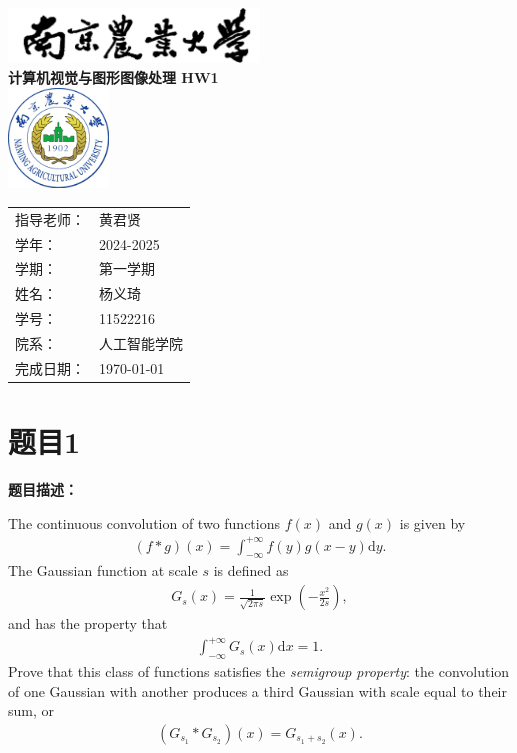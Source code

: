 \documentclass[UTF8]{ctexart}
\begin{document}
	\begin{titlepage}
		\centering
		\vspace*{2cm}
		\includegraphics[width=0.5\textwidth]{./image/name.png}\\[1cm] %
		{\Huge \textbf{计算机视觉与图形图像处理 HW1}}\\[2cm]
		\includegraphics[width=0.2\textwidth]{./image/NJAU.eps}\\[2cm] %
	    \begin{tabular}{ll} %
			{\Large 指导老师：} & {\Large 黄君贤} \\[0.5cm]
			{\Large 学年：} & {\Large 2024-2025} \\[0.5cm]
			{\Large 学期：} & {\Large 第一学期} \\[0.5cm]
			{\Large 姓名：} & {\Large 杨义琦} \\[0.5cm]
			{\Large 学号：} & {\Large 11522216} \\[0.5cm]
			{\Large 院系：} & {\Large 人工智能学院} \\[0.5cm]
			{\Large 完成日期：} & {\Large \today} \\ 
		\end{tabular}
		\vfill
	\end{titlepage}
	
	
	\section{题目1}
	\textbf{题目描述：}
	
	The continuous convolution of two functions $f(x)$ and $g(x)$ is given by
	\begin{align}
		\left(f*g\right)\left(x\right)=\int_{-\infty}^{+\infty}f\left(y\right)g\left(x-y\right) \mathrm{d}y.
	\end{align}
	The Gaussian function at scale $s$ is defined as
	\begin{align}
		G_s\left(x\right)=\frac{1}{\sqrt{2\pi s}}\exp\left(-\frac{x^2}{2s}\right),
	\end{align}
	and has the property that
	\begin{align}
		\int_{-\infty}^{+\infty}G_s\left(x\right) \mathrm{d}x=1.
	\end{align}
	Prove that this class of functions satisfies the \textit{semigroup property}: the convolution of one
	Gaussian with another produces a third Gaussian with scale equal to their sum, or
	\begin{align}
		\left(G_{s_1}*G_{s_2}\right)\left(x\right)=G_{s_1+s_2}\left(x\right).
	\end{align}
	
\end{document}

